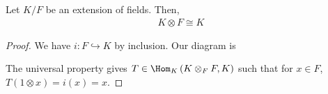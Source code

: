 \documentclass[10pt]{mypackage}
\begin{document}
  \begin{proposition}
    Let $K/F$ be an extension of fields. Then,
    \begin{align*}
      K\otimes F \cong K
    \end{align*}
  \end{proposition}
  \begin{proof}
    We have $i: F\hookrightarrow K$ by inclusion. Our diagram is
    \begin{center}
    \end{center}
  The universal property gives $T\in \Hom_{K}\left(K\otimes_{F}F,K\right)$ such that for $x\in F$, $T\left(1\otimes x\right) = i(x) = x$.\newline


\end{proof}
\end{document}
